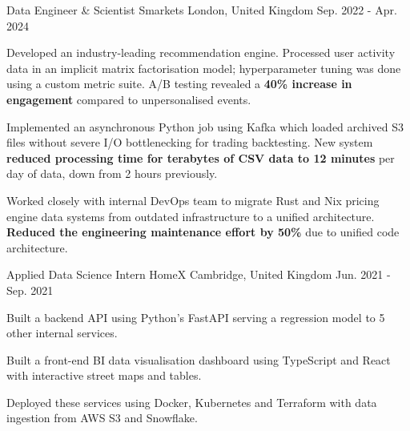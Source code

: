 \begin{cventries}
  \cventry
    {Data Engineer \& Scientist} %
    {Smarkets} %
    {London, United Kingdom} %
    {Sep. 2022 - Apr. 2024} %
    {
      \begin{cvitems} %
        \item {Developed an industry-leading recommendation engine. Processed user activity data in an implicit matrix factorisation model; hyperparameter tuning was done using a custom metric suite. A/B testing revealed a \textbf{40\% increase in engagement} compared to unpersonalised events.}
        \item {Implemented an asynchronous Python job using Kafka which loaded archived S3 files without severe I/O bottlenecking for trading backtesting. New system \textbf{reduced processing time for terabytes of CSV data to 12 minutes} per day of data, down from 2 hours previously.}
        \item {Worked closely with internal DevOps team to migrate Rust and Nix pricing engine data systems from outdated infrastructure to a unified architecture. \textbf{Reduced the engineering maintenance effort by 50\%} due to unified code architecture.}
      \end{cvitems}
    }

  \cventry
    {Applied Data Science Intern} %
    {HomeX} %
    {Cambridge, United Kingdom} %
    {Jun. 2021 - Sep. 2021} %
    {
      \begin{cvitems} %
        \item {Built a backend API using Python's FastAPI serving a regression model to 5 other internal services.}
        \item {Built a front-end BI data visualisation dashboard using TypeScript and React with interactive street maps and tables.}
        \item {Deployed these services using Docker, Kubernetes and Terraform with data ingestion from AWS S3 and Snowflake.}
      \end{cvitems}
    }


\end{cventries}
